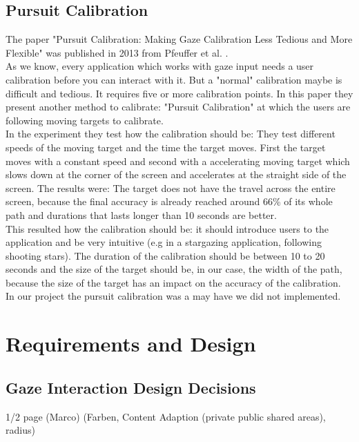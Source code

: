 \documentclass{sigchi}
\begin{document}
\subsection{Pursuit Calibration}
The paper "Pursuit Calibration: Making Gaze Calibration Less Tedious and More Flexible" was published in 2013 from Pfeuffer et al.  \cite{pfeuffer2013pursuit}.\\
As we know, every application which works with gaze input needs a user calibration before you can interact with it. But a "normal" calibration maybe is difficult and tedious. It requires five or more calibration points. In this paper they present another method to calibrate: "Pursuit Calibration" at which the users are following moving targets to calibrate.\\
In the experiment they test how the calibration should be: They test different speeds of the moving target and the time the target moves. First the target moves with a constant speed and second with a accelerating moving target which slows down at the corner of the screen and accelerates at the straight side of the screen. The results were: The target does not have the travel across the entire screen, because the final accuracy is already reached around 66\% of its whole path and durations that lasts longer than 10 seconds are better.\\
This resulted how the calibration should be: it should introduce users to the application and be very intuitive (e.g in a stargazing application, following shooting stars). The duration of the calibration should be between 10 to 20 seconds and the size of the target should be, in our case, the width of the path, because the size of the target has an impact on the accuracy of the calibration.\\
In our project the pursuit calibration was a may have we did not implemented.

\section{Requirements and Design}
\subsection{Gaze Interaction Design Decisions}
1/2 page (Marco) (Farben, Content Adaption (private public shared areas), radius)
\end{document}
